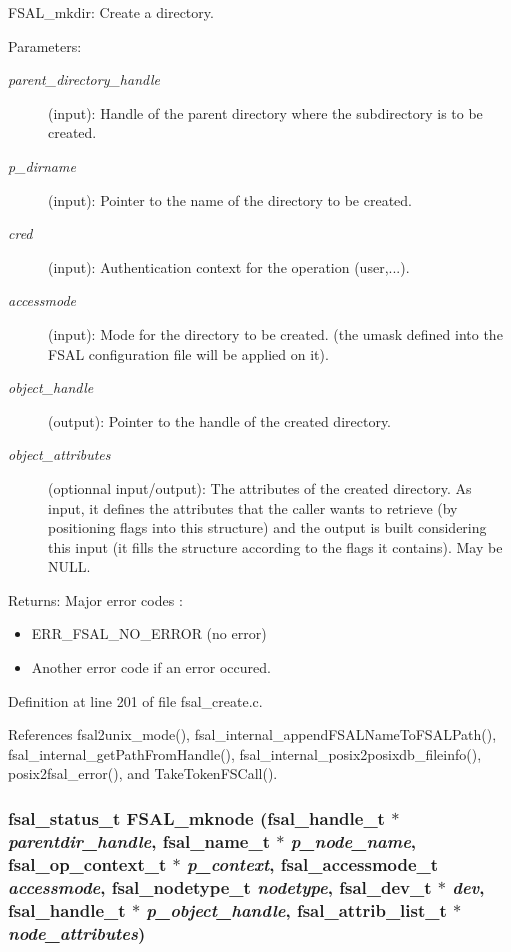 FSAL\_\-mkdir: Create a directory.

\begin{Desc}
\item[Parameters:]
\begin{description}
\item[{\em parent\_\-directory\_\-handle}](input): Handle of the parent directory where the subdirectory is to be created. \item[{\em p\_\-dirname}](input): Pointer to the name of the directory to be created. \item[{\em cred}](input): Authentication context for the operation (user,...). \item[{\em accessmode}](input): Mode for the directory to be created. (the umask defined into the FSAL configuration file will be applied on it). \item[{\em object\_\-handle}](output): Pointer to the handle of the created directory. \item[{\em object\_\-attributes}](optionnal input/output): The attributes of the created directory. As input, it defines the attributes that the caller wants to retrieve (by positioning flags into this structure) and the output is built considering this input (it fills the structure according to the flags it contains). May be NULL.\end{description}
\end{Desc}
\begin{Desc}
\item[Returns:]Major error codes :\begin{itemize}
\item ERR\_\-FSAL\_\-NO\_\-ERROR (no error)\item Another error code if an error occured. \end{itemize}
\end{Desc}


Definition at line 201 of file fsal\_\-create.c.

References fsal2unix\_\-mode(), fsal\_\-internal\_\-appendFSALNameToFSALPath(), fsal\_\-internal\_\-getPathFromHandle(), fsal\_\-internal\_\-posix2posixdb\_\-fileinfo(), posix2fsal\_\-error(), and TakeTokenFSCall().
\subsubsection[{FSAL\_\-mknode}]{\setlength{\rightskip}{0pt plus 5cm}fsal\_\-status\_\-t FSAL\_\-mknode (fsal\_\-handle\_\-t $\ast$ {\em parentdir\_\-handle}, \/  fsal\_\-name\_\-t $\ast$ {\em p\_\-node\_\-name}, \/  fsal\_\-op\_\-context\_\-t $\ast$ {\em p\_\-context}, \/  fsal\_\-accessmode\_\-t {\em accessmode}, \/  fsal\_\-nodetype\_\-t {\em nodetype}, \/  fsal\_\-dev\_\-t $\ast$ {\em dev}, \/  fsal\_\-handle\_\-t $\ast$ {\em p\_\-object\_\-handle}, \/  fsal\_\-attrib\_\-list\_\-t $\ast$ {\em node\_\-attributes})}\label{fsal__create_8c_344a6fd2ad23cc03509f7e7f3bf1fd1c}


